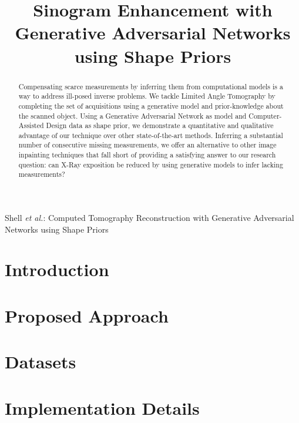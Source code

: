 \documentclass[journal]{IEEEtran}
\begin{document}
\title{Sinogram Enhancement with Generative Adversarial Networks using Shape Priors}

%
{Shell \MakeLowercase{\textit{et al.}}: \xr Computed Tomography Reconstruction with Generative Adversarial Networks using Shape Priors}
\maketitle

\begin{abstract}
Compensating scarce measurements by inferring them from computational models is a way to address ill-posed inverse problems. We tackle Limited Angle Tomography by completing the set of acquisitions using a generative model and prior-knowledge about the scanned object.
Using a Generative Adversarial Network as model and Computer-Assisted Design data as shape prior, we demonstrate a quantitative and qualitative advantage of our technique over other state-of-the-art methods. Inferring a substantial number of consecutive missing measurements, we offer an alternative to other image inpainting techniques that fall short of providing a satisfying answer to our research question: can X-Ray exposition be reduced by using generative models to infer lacking measurements?  
\end{abstract}


\IEEEpeerreviewmaketitle

 \section{Introduction}



\section{Proposed Approach}



\section{Datasets}



\section{Implementation Details}
\end{document}
